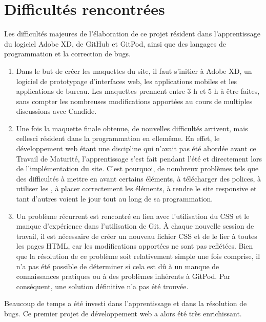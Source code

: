\documentclass[a4,10pt,french]{sphinxmanual}
\begin{document}
\section{Difficultés rencontrées}
\label{\detokenize{chapitre-03:difficultes-rencontrees}}
\sphinxAtStartPar
Les difficultés majeures de l’élaboration de ce projet résident dans l’apprentissage du logiciel Adobe XD, de GitHub et GitPod, ainsi que des langages de programmation et la correction de bugs.
\begin{enumerate}
%
\item {} 
\sphinxAtStartPar
Dans le but de créer les maquettes du site, il faut s’initier à Adobe XD, un logiciel de prototypage d’interfaces web, les applications mobiles et les applications de bureau. Les maquettes prennent entre 3 h et 5 h à être faites, sans compter les nombreuses modifications apportées au cours de multiples discussions avec Candide.

\item {} 
\sphinxAtStartPar
Une fois la maquette finale obtenue, de nouvelles difficultés arrivent, mais celles\sphinxhyphen{}ci résident dans la programmation en elle\sphinxhyphen{}même. En effet, le développement web étant une discipline qui n’avait pas été abordée avant ce Travail de Maturité, l’apprentissage s’est fait pendant l’été et directement lors de l’implémentation du site. C’est pourquoi, de nombreux problèmes tels que des difficultés à mettre en avant certains éléments, à télécharger des polices, à utiliser les , à placer correctement les éléments, à rendre le site responsive et tant d’autres voient le jour tout au long de sa programmation.

\item {} 
\sphinxAtStartPar
Un problème récurrent est rencontré en lien avec l’utilisation du CSS et le manque d’expérience dans l’utilisation de Git. À chaque nouvelle session de travail, il est nécessaire de créer un nouveau fichier CSS et de le lier à toutes les pages HTML, car les modifications apportées ne sont pas reflétées. Bien que la résolution de ce problème soit relativement simple une fois comprise, il n’a pas été possible de déterminer si cela est dû à un manque de connaissances pratiques ou à des problèmes inhérents à GitPod. Par conséquent, une solution définitive n’a pas été trouvée.

\end{enumerate}

\sphinxAtStartPar
Beaucoup de temps a été investi dans l’apprentissage et dans la résolution de bugs. Ce premier projet de développement web a alors été très enrichissant.
\end{document}
